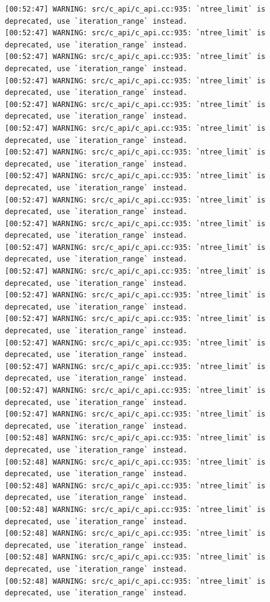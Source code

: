 \documentclass[
  letterpaper,
  DIV=11,
  numbers=noendperiod]{scrartcl}
\begin{document}
\begin{verbatim}
[00:52:47] WARNING: src/c_api/c_api.cc:935: `ntree_limit` is deprecated, use `iteration_range` instead.
[00:52:47] WARNING: src/c_api/c_api.cc:935: `ntree_limit` is deprecated, use `iteration_range` instead.
[00:52:47] WARNING: src/c_api/c_api.cc:935: `ntree_limit` is deprecated, use `iteration_range` instead.
[00:52:47] WARNING: src/c_api/c_api.cc:935: `ntree_limit` is deprecated, use `iteration_range` instead.
[00:52:47] WARNING: src/c_api/c_api.cc:935: `ntree_limit` is deprecated, use `iteration_range` instead.
[00:52:47] WARNING: src/c_api/c_api.cc:935: `ntree_limit` is deprecated, use `iteration_range` instead.
[00:52:47] WARNING: src/c_api/c_api.cc:935: `ntree_limit` is deprecated, use `iteration_range` instead.
[00:52:47] WARNING: src/c_api/c_api.cc:935: `ntree_limit` is deprecated, use `iteration_range` instead.
[00:52:47] WARNING: src/c_api/c_api.cc:935: `ntree_limit` is deprecated, use `iteration_range` instead.
[00:52:47] WARNING: src/c_api/c_api.cc:935: `ntree_limit` is deprecated, use `iteration_range` instead.
[00:52:47] WARNING: src/c_api/c_api.cc:935: `ntree_limit` is deprecated, use `iteration_range` instead.
[00:52:47] WARNING: src/c_api/c_api.cc:935: `ntree_limit` is deprecated, use `iteration_range` instead.
[00:52:47] WARNING: src/c_api/c_api.cc:935: `ntree_limit` is deprecated, use `iteration_range` instead.
[00:52:47] WARNING: src/c_api/c_api.cc:935: `ntree_limit` is deprecated, use `iteration_range` instead.
[00:52:47] WARNING: src/c_api/c_api.cc:935: `ntree_limit` is deprecated, use `iteration_range` instead.
[00:52:47] WARNING: src/c_api/c_api.cc:935: `ntree_limit` is deprecated, use `iteration_range` instead.
[00:52:47] WARNING: src/c_api/c_api.cc:935: `ntree_limit` is deprecated, use `iteration_range` instead.
[00:52:47] WARNING: src/c_api/c_api.cc:935: `ntree_limit` is deprecated, use `iteration_range` instead.
[00:52:48] WARNING: src/c_api/c_api.cc:935: `ntree_limit` is deprecated, use `iteration_range` instead.
[00:52:48] WARNING: src/c_api/c_api.cc:935: `ntree_limit` is deprecated, use `iteration_range` instead.
[00:52:48] WARNING: src/c_api/c_api.cc:935: `ntree_limit` is deprecated, use `iteration_range` instead.
[00:52:48] WARNING: src/c_api/c_api.cc:935: `ntree_limit` is deprecated, use `iteration_range` instead.
[00:52:48] WARNING: src/c_api/c_api.cc:935: `ntree_limit` is deprecated, use `iteration_range` instead.
[00:52:48] WARNING: src/c_api/c_api.cc:935: `ntree_limit` is deprecated, use `iteration_range` instead.
[00:52:48] WARNING: src/c_api/c_api.cc:935: `ntree_limit` is deprecated, use `iteration_range` instead.

\end{verbatim}
\end{document}
